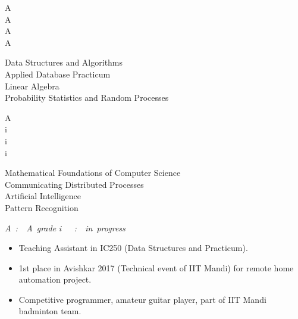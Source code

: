 \documentclass[]{awesome-cv}
\begin{document}
\vspace{-3mm}


\vspace{-5mm}
\begin{cvhonors}
	\begin{minipage}[t]{0.05\textwidth}
		A\\
		A\\
		A\\
		A
	\end{minipage}\begin{minipage}[t]{0.45\textwidth}
		 Data Structures and Algorithms\\	
		 Applied Database Practicum\\	
		 Linear Algebra\\	
		 Probability Statistics and Random Processes	
	\end{minipage}\begin{minipage}[t]{0.05\textwidth}
		A\\
		i\\
		i\\
		i
	\end{minipage}\begin{minipage}[t]{0.45\textwidth}
		Mathematical Foundations of Computer Science\\
		Communicating Distributed Processes\\
		Artificial Intelligence\\	
		Pattern Recognition\\	
	\end{minipage}	

\color[HTML]{b30000}
\textit{A~:~~A~grade }
\textit{i~~~:~~in~progress}  
	
\end{cvhonors}




\vspace{-5mm}




\begin{itemize}
	\item Teaching Assistant in IC250 (Data Structures and Practicum).
	\item 1st place in Avishkar 2017 (Technical event of IIT Mandi) for remote home automation project.
	\item Competitive programmer, amateur guitar player, part of IIT Mandi badminton team.
\end{itemize}



\vspace{-8mm}
\ 
\end{document}
